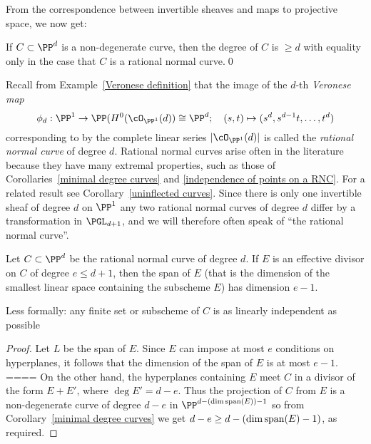From the correspondence between invertible sheaves and maps to projective space, we now get:
\begin{corollary}\label{minimal degree curves}
If $C\subset \PP^d$ is a  non-degenerate curve, then the degree of $C$ is $\geq d$ with equality only in the case
that $C$ is a rational normal curve.\qed
\end{corollary}

Recall from Example~\ref{Veronese definition} that the image of the $d$-th \emph{Veronese map}  
$$
\phi_d: \PP^1 \to \PP(H^0(\cO_{\PP^1}(d)) \cong \PP^d; \quad (s,t) \mapsto (s^d, s^{d-1}t, \dots, t^d)
$$
corresponding to by the complete linear series $|\cO_{\PP^1}(d)|$ is called the \emph{rational normal curve} of degree $d$. Rational normal curves arise often in the literature because they have many extremal properties, such as those of Corollaries~\ref{minimal degree curves} and \ref{independence of points on a RNC}. For a related result see Corollary~\ref{uninflected curves}. Since there is only
one invertible sheaf of degree $d$ on $\PP^1$ any two rational normal curves of degree $d$ differ by a transformation in $\PGL_{d+1}$,
and we will therefore often speak of ``the rational normal curve''.

\begin{corollary}\label{independence of points on a RNC}
Let $C\subset \PP^d$ be the rational normal curve of degree $d$. If $E$ is an effective divisor on $C$ of degree $e\leq d+1$, then the
span of $E$ (that is the dimension of the smallest linear space containing the subscheme $E$) has dimension $e-1$.
\end{corollary}
Less formally: any finite set or subscheme of $C$ is as linearly independent as possible

\begin{proof}
Let $L$ be the span of $E$. Since $E$ can impose at most $e$ conditions on hyperplanes, it follows that the dimension of the span of $E$ is
at most $e-1$.
====
On the other hand, the hyperplanes containing $E$ meet $C$ in a divisor of the form $E+E'$, where
$\deg E' = d-e$. Thus the projection of $C$ from $E$ is a non-degenerate curve of degree $d-e$ in $\PP^{d-(\dim {\rm span}(E))-1}$
so from Corollary~\ref{minimal degree curves} we get $d-e \geq d-(\dim {\rm span}(E)-1)$, as required.
\end{proof}

